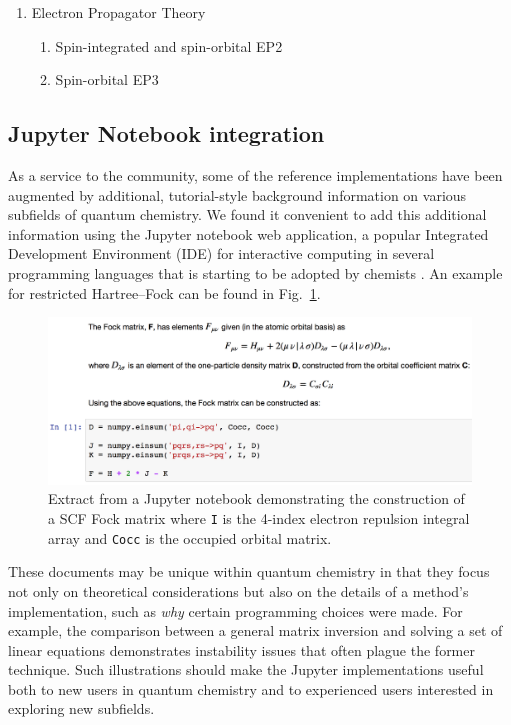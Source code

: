 \documentclass[journal=jctcce,manuscript=article]{achemso}
\begin{document}
\begin{enumerate}
\item Electron Propagator Theory
    \begin{enumerate}
    \item Spin-integrated and spin-orbital EP2
    \item Spin-orbital EP3
    \end{enumerate}


\end{enumerate}


\subsection{Jupyter Notebook integration}

As a service to the community, some of the reference implementations have been augmented by additional, tutorial-style background information on various subfields of quantum chemistry.  We found it convenient to add this additional information using the Jupyter notebook web application,\cite{Granger:1521-9615} a popular Integrated Development Environment (IDE) for interactive computing in several programming languages that is starting to be adopted by chemists \cite{charles:2017:592}.  An example for restricted Hartree--Fock can be found in Fig.~\ref{fig:ipython}.

\begin{figure}[H]
  \includegraphics[width=\linewidth,keepaspectratio]{fig2-ipython-rhf.png}
  \caption{Extract from a Jupyter notebook demonstrating the construction of a SCF Fock matrix where {\tt I} is the 4-index electron repulsion integral array and {\tt Cocc} is the occupied orbital matrix.}
  \label{fig:ipython}
\end{figure}

These documents may be unique within quantum chemistry in that they focus not only on theoretical considerations but also on the details of a method's implementation, such as {\em why} certain programming choices were made. For example, the comparison between a general matrix inversion and solving a set of linear equations demonstrates instability issues that often plague the former technique. Such illustrations should make the Jupyter implementations useful both to new users in quantum chemistry and to experienced users interested in exploring new subfields.
\end{document}
